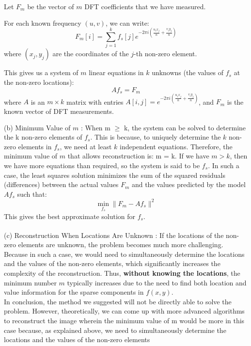 \documentclass{article}
\begin{document}
\begin{enumerate}
Let \( {F}_m \) be the vector of \( m \) DFT coefficients that we have measured.

For each known frequency \( (u, v) \), we can write:
\[
{F}_m[i] = \sum_{j=1}^{k} f_s[j] e^{-2\pi i \left( \frac{u_i x_j}{n} + \frac{v_i y_j}{n} \right)}
\]
where \( (x_j, y_j) \) are the coordinates of the \( j \)-th non-zero element.

This gives us a system of \( m \) linear equations in \( k \) unknowns (the values of \( f_s \) at the non-zero locations):
\[
A f_s = {F}_m
\]
where \( A \) is an \( m \times k \) matrix with entries \( A[i, j] = e^{-2\pi i \left( \frac{u_i x_j}{n} + \frac{v_i y_j}{n} \right)} \), and \( {F}_m \) is the known vector of DFT measurements.

(b) Minimum Value of \( m \) : When m $\geq$ k, the system can be solved to determine the k non-zero elements of \( f_s \). This is because, to uniquely determine the \( k \) non-zero elements in \( f_s \), we need at least \( k \) independent equations. Therefore, the minimum value of \( m \) that allows reconstruction is: m = k. If we have $m > k$, then we have more equations than required, so the system is said to be \( f_s \). In such a case, the least squares solution minimizes the sum of the squared residuals (differences) between the actual values \( F_m \) and the values predicted by the model \( A f_s \) such that:
\[
\min_{f_s} \| F_m - A f_s \|^2
\]
This gives the best approximate solution for \( f_s \).
\\\\
(c) Reconstruction When Locations Are Unknown : If the locations of the non-zero elements are unknown, the problem becomes much more challenging. Because in such a case, we would need to simultaneously determine the locations and the values of the non-zero elements, which significantly increases the complexity of the reconstruction. Thus, \textbf{without knowing the locations}, the minimum number \( m \) typically increases due to the need to find both location and value information for the sparse components in \( f(x, y) \).\\
In conclusion, the method we suggested will not be directly able to solve the problem. However, theoretically, we can come up with more advanced algorithms to reconstruct the image wherein the minimum value of m would be more in this case because, as explained above, we need to simultaneously determine the locations and the values of the non-zero elements
\end{enumerate}
\end{document}
